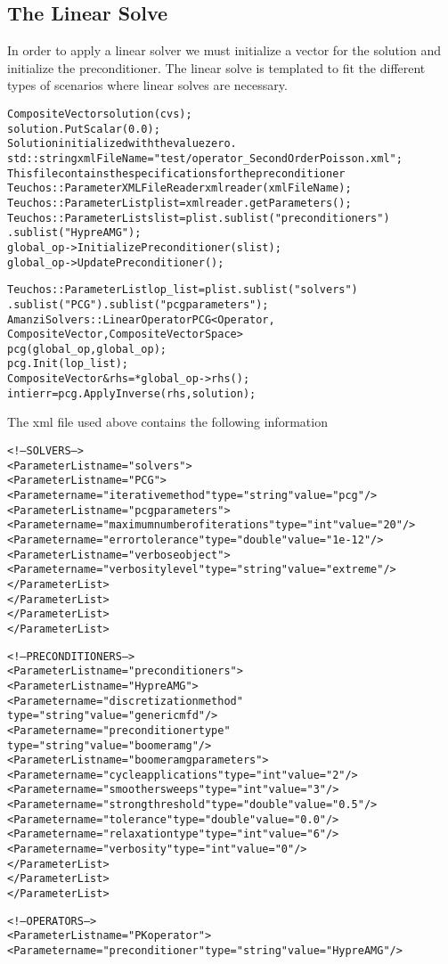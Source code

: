 \subsection{The Linear Solve}\label{Sec:Linear Solve}
%
In order to apply a linear solver we must initialize a vector for the solution and initialize the preconditioner. The linear solve is templated to fit the different types of scenarios where linear solves are necessary.
%
\begin{alltt}
	CompositeVector solution(cvs);
	solution.PutScalar(0.0); \\Solution initialized with the value zero.
	std::string xmlFileName = "test/operator_SecondOrderPoisson.xml"; \\This file contains the specifications for the preconditioner
	Teuchos::ParameterXMLFileReader xmlreader(xmlFileName);
	Teuchos::ParameterList plist = xmlreader.getParameters();
	Teuchos::ParameterList slist = plist.sublist("preconditioners")
	.sublist("Hypre AMG");
	global_op->InitializePreconditioner(slist);
	global_op->UpdatePreconditioner();
	
	Teuchos::ParameterList lop_list = plist.sublist("solvers")
	.sublist("PCG").sublist("pcg parameters");
	AmanziSolvers::LinearOperatorPCG<Operator, 
	CompositeVector, CompositeVectorSpace>
	pcg(global_op, global_op);
	pcg.Init(lop_list);
	CompositeVector& rhs = *global_op->rhs();
	int ierr = pcg.ApplyInverse(rhs, solution);
\end{alltt}
%
The xml file used above contains the following information
%
\begin{alltt}
	<!-- SOLVERS -->
	<ParameterList name="solvers">
	<ParameterList name="PCG">
	<Parameter name="iterative method" type="string" value="pcg"/>
	<ParameterList name="pcg parameters">
	<Parameter name="maximum number of iterations" type="int" value="20"/>
	<Parameter name="error tolerance" type="double" value="1e-12"/>
	<ParameterList name="verbose object">
	<Parameter name="verbosity level" type="string" value="extreme"/>
	</ParameterList>
	</ParameterList>
	</ParameterList>
	</ParameterList>
	
	<!-- PRECONDITIONERS -->
	<ParameterList name="preconditioners">
	<ParameterList name="Hypre AMG">
	<Parameter name="discretization method" 
	type="string" value="generic mfd"/>
	<Parameter name="preconditioner type" 
	type="string" value="boomer amg"/>
	<ParameterList name="boomer amg parameters">
	<Parameter name="cycle applications" type="int" value="2"/>
	<Parameter name="smoother sweeps" type="int" value="3"/>
	<Parameter name="strong threshold" type="double" value="0.5"/>
	<Parameter name="tolerance" type="double" value="0.0"/>
	<Parameter name="relaxation type" type="int" value="6"/>
	<Parameter name="verbosity" type="int" value="0"/>
	</ParameterList>
	</ParameterList>
	</ParameterList>
	
	<!--  OPERATORS  -->
	<ParameterList name="PK operator">
	<Parameter name="preconditioner" type="string" value="Hypre AMG"/>
\end{alltt}